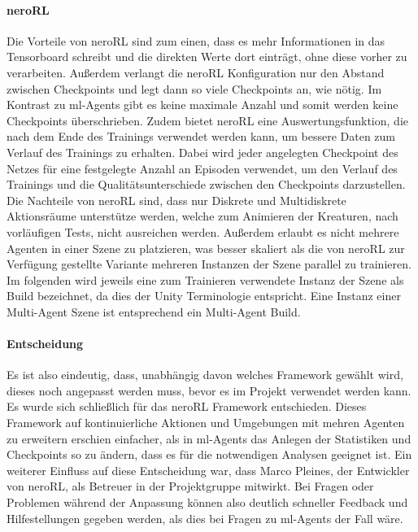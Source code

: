 \paragraph{neroRL}\fup
\noindent Die Vorteile von neroRL sind zum einen, dass es mehr Informationen in das Tensorboard schreibt und die direkten Werte dort einträgt, ohne diese vorher zu verarbeiten. Außerdem verlangt die neroRL Konfiguration nur den Abstand zwischen Checkpoints und legt dann so viele Checkpoints an, wie nötig. Im Kontrast zu ml-Agents gibt es keine maximale Anzahl und somit werden keine Checkpoints überschrieben. 
Zudem bietet neroRL eine Auswertungsfunktion, die nach dem Ende des Trainings verwendet werden kann, um bessere Daten zum Verlauf des Trainings zu erhalten.
Dabei wird jeder angelegten Checkpoint des Netzes für eine festgelegte Anzahl an Episoden verwendet, um den Verlauf des Trainings und die Qualitätsunterschiede zwischen den Checkpoints darzustellen.
Die Nachteile von neroRL sind, dass nur Diskrete und Multidiskrete Aktionsräume unterstütze werden, welche zum Animieren der Kreaturen, nach vorläufigen Tests, nicht ausreichen werden. Außerdem erlaubt es nicht mehrere Agenten in einer Szene zu platzieren, was besser skaliert als die von neroRL zur Verfügung gestellte Variante mehreren Instanzen der Szene parallel zu trainieren. Im folgenden wird jeweils eine zum Trainieren verwendete Instanz der Szene als Build bezeichnet, da dies der Unity Terminologie entspricht. Eine Instanz einer Multi-Agent Szene ist entsprechend ein Multi-Agent Build.\\
\paragraph{Entscheidung}\fup
\noindent Es ist also eindeutig, dass, unabhängig davon welches Framework gewählt wird, dieses noch angepasst werden muss, bevor es im Projekt verwendet werden kann. Es wurde sich schließlich für das neroRL Framework entschieden. Dieses Framework auf kontinuierliche Aktionen und Umgebungen mit mehren Agenten zu erweitern erschien einfacher, als in ml-Agents das Anlegen der Statistiken und Checkpoints so zu ändern, dass es für die notwendigen Analysen geeignet ist. 
Ein weiterer Einfluss auf diese Entscheidung war, dass Marco Pleines, der Entwickler von neroRL, als Betreuer in der Projektgruppe mitwirkt. Bei Fragen oder Problemen während der Anpassung können also deutlich schneller Feedback und Hilfestellungen gegeben werden, als dies bei Fragen zu ml-Agents der Fall wäre.

